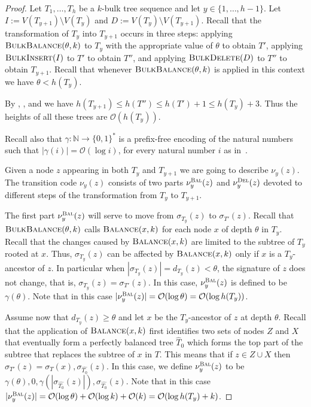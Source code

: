 \documentclass[kpfonts]{patmorin}
\newcommand{\Oh}{\mathcal{O}}
\let\leq\leqslant
\let\geq\geqslant
\begin{document}
\begin{proof}
  Let $T_1,\ldots,T_h$ be a $k$-bulk tree sequence and let $y\in\{1,\ldots,h-1\}$. Let $I:=V(T_{y+1})\setminus V(T_y)$ and $D:=V(T_y) \setminus V(T_{y+1})$.
  Recall that the transformation of $T_{y}$ into $T_{y+1}$ occurs in three steps:
  applying $\textsc{BulkBalance}(\theta,k)$ to $T_y$ with the appropriate value of $\theta$ to obtain $T'$,
  applying $\textsc{BulkInsert}(I)$ to $T'$ to obtain $T''$, and
  applying $\textsc{BulkDelete}(D)$ to $T''$ to obtain $T_{y+1}$.
  Recall that whenever $\textsc{BulkBalance}(\theta,k)$ is applied in this context we have $\theta < h(T_y)$.

  By , , and  we have  $h(T_{y+1}) \leq h(T'') \leq h(T')+1 \leq h(T_y)+3$.
  Thus the heights of all these trees are $\Oh(h(T_y))$.

  Recall also that $\gamma:\mathbb{N}\to\{0,1\}^*$ is a prefix-free encoding of the natural numbers such that $|\gamma(i)|=\Oh(\log i)$, for every natural number $i$ as in~.

  Given a node $z$ appearing in both $T_y$ and $T_{y+1}$ we are going to describe $\nu_y(z)$.
  The transition code $\nu_y(z)$ consists of two parts $\nu_y^{\textsc{Bal}}(z)$ and $\nu_y^{\textsc{Del}}(z)$ devoted to different steps of the transformation from $T_y$ to $T_{y+1}$.

  The first part $\nu_y^{\textsc{Bal}}(z)$ will serve to move from $\sigma_{T_y}(z)$ to $\sigma_{T'}(z)$.
  Recall that $\textsc{BulkBalance}(\theta,k)$ calls $\textsc{Balance}(x,k)$ for each node $x$ of depth $\theta$  in $T_y$.
  Recall that the changes caused by $\textsc{Balance}(x,k)$ are limited to the subtree of $T_y$ rooted at $x$.
  Thus, $\sigma_{T_y}(z)$ can be affected by $\textsc{Balance}(x,k)$ only if $x$ is a $T_y$-ancestor of $z$.
  In particular when $|\sigma_{T_y}(z)| = d_{T_y}(z) < \theta$, the signature of $z$ does not change, that is, $\sigma_{T_y}(z)=\sigma_{T'}(z)$. In this case,  $\nu_y^{\textsc{Bal}}(z)$ is defined to be $\gamma(\theta)$.
  Note that in this case $|\nu^{\textsc{Bal}}_y(z)|=\Oh(\log\theta) = \Oh(\log h(T_y))$.

  Assume now that $d_{T_y}(z) \geq \theta$ and let $x$ be the $T_y$-ancestor of $z$ at depth $\theta$.
  Recall that the application of $\textsc{Balance}(x,k)$ first identifies two sets of nodes $Z$ and $X$ that eventually form a perfectly balanced tree $\hat{T}_0$ which forms the top part of the subtree that replaces the subtree of $x$ in $T$.
  This means that if $z\in Z\cup X$ then $\sigma_{T'}(z) = \sigma_{T}(x),\sigma_{\hat{T_0}}(z)$.
  In this case, we define $\nu_y^{\textsc{Bal}}(z)$ to be $\gamma(\theta),0,\gamma(|\sigma_{\hat{T_0}}(z)|),\sigma_{\hat{T_0}}(z)$.
  Note that in this case $|\nu^{\textsc{Bal}}_y(z)|=\Oh(\log\theta) + \Oh(\log k) + \Oh(k) = \Oh(\log h(T_y) + k)$.


\end{proof}
\end{document}
